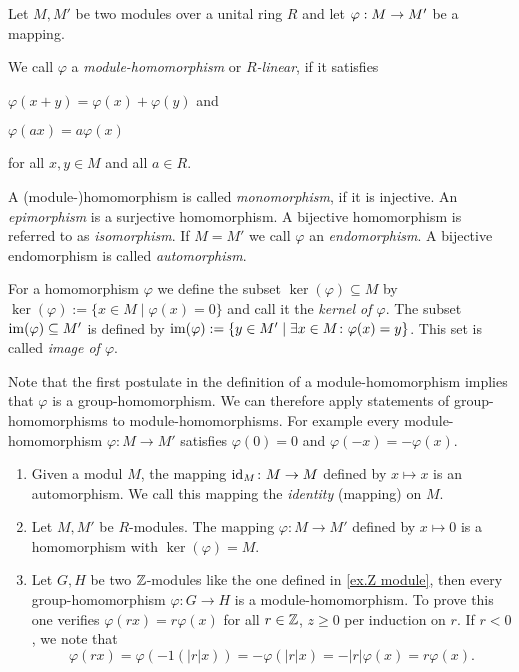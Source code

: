  \begin{defin}
Let $M,M'$ be two modules over a unital ring $R$ and let $\varphi : M \rightarrow M'$ be a mapping. 
\begin{thmlist}
\item We call $\varphi$ a \emph{module-homomorphism} or \textit{$R$-linear}, if it satisfies
\begin{exlist}
\item $\varphi(x+y)=\varphi(x)+\varphi(y)$ and
\item $\varphi(ax)=a\varphi(x)$
\end{exlist}
for all $x,y \in M$ and all $a \in R$.
\item A (module-)homomorphism is called \textit{monomorphism}, if it is injective. An \emph{epimorphism} is a surjective homomorphism. A bijective homomorphism is referred to as \textit{isomorphism}. If $M=M'$ we call $\varphi$ an \textit{endomorphism}. A bijective endomorphism is called \textit{automorphism}.
\item For a homomorphism $\varphi$ we define the subset $\ker(\varphi)\subseteq M$ by $\ker(\varphi):=\lbrace x\in M \mid \varphi(x)=0\rbrace$ and call it the \emph{kernel of $\varphi$}. The subset $\operatorname{im}(\varphi)\subseteq M'$ is defined by $\operatorname{im}(\varphi):=\lbrace y\in M' \mid \exists x\in M\colon \varphi(x)=y\rbrace$. This set is called \emph{image of $\varphi$}.
\end{thmlist}
\end{defin}

Note that the first postulate in the definition of a module-homomorphism implies that $\varphi$ is a group-homomorphism. We can therefore apply statements of group-homomorphisms to module-homomorphisms. For example every module-homomorphism $\varphi\colon M\rightarrow M'$ satisfies $\varphi(0)=0$ and $\varphi(-x)=-\varphi(x)$.

\begin{exam}
\begin{enumerate}
\item Given a modul $M$, the mapping $\operatorname{id}_M\colon M \rightarrow M$ defined by $x\mapsto x$ is an automorphism. We  call this mapping the \emph{identity} (mapping) on $M$.
\item Let $M, M'$ be $R$-modules. The mapping $\varphi\colon M\rightarrow M'$ defined by $x\mapsto 0$ is a homomorphism with $\ker(\varphi)=M$. 
\item Let $G, H$ be two $\operatorname{\mathbb{Z}}$-modules like the one defined in \cref{ex.Z module}, then every group-homomorphism $\varphi\colon G\rightarrow H$ is a module-homomorphism. To prove this one verifies $\varphi(rx)=r\varphi(x)$ for all $r\in\operatorname{\mathbb{Z}}$, $z\geq 0$ per induction on $r$. If $r<0$, we note that 
\begin{equation*}
\varphi(rx)=\varphi(-1(\lvert r\rvert x))=-\varphi(\lvert r\rvert x)=-\lvert r\rvert\varphi(x)=r\varphi(x).
\end{equation*}
\end{enumerate}
\end{exam}

